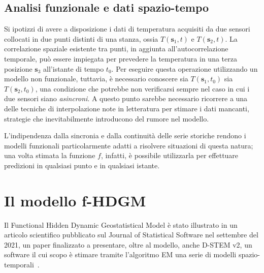 \subsection[Analisi funzionale e dati spazio-tempo]{Analisi funzionale e dati spazio-tempo}
Si ipotizzi di avere a disposizione i dati di temperatura acquisiti da due sensori collocati in due punti distinti di una stanza, ossia $T(\mathbf{s}_1, t)$ e $T(\mathbf{s}_2, t)$. La correlazione spaziale esistente tra punti, in aggiunta all'autocorrelazione temporale, può essere impiegata per prevedere la temperatura in una terza posizione $\mathbf{s}_3$ all'istante di tempo $t_0$. Per eseguire questa operazione utilizzando un modello non funzionale, tuttavia, è necessario conoscere sia $T(\mathbf{s}_1, t_0)$ sia $T(\mathbf{s}_2, t_0)$, una condizione che potrebbe non verificarsi sempre nel caso in cui i due sensori siano \textit{asincroni}. A questo punto sarebbe necessario ricorrere a una delle tecniche di interpolazione note in letteratura per stimare i dati mancanti, strategie che inevitabilmente introducono del rumore nel modello. \par L'indipendenza dalla sincronia e dalla continuità delle serie storiche rendono i modelli funzionali particolarmente adatti a risolvere situazioni di questa natura; una volta stimata la funzione $f$, infatti, è possibile utilizzarla per effettuare predizioni in qualsiasi punto e in qualsiasi istante.

\section[Il modello f-HDGM]{Il modello f-HDGM}
Il Functional Hidden Dynamic Geostatistical Model è stato illustrato in un articolo scientifico pubblicato sul Journal of Statistical Software nel settembre del \num{2021}, un paper finalizzato a presentare, oltre al modello, anche D-STEM v2, un software il cui scopo è stimare tramite l'algoritmo EM una serie di modelli spazio-temporali~\cite{paper_f_HDGM}.

